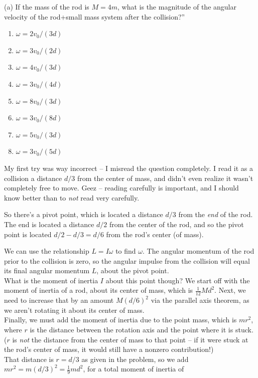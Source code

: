\documentclass[8.01x]{subfiles}
\begin{document}
(a) If the mass of the rod is $M=4m$, what is the magnitude of the angular velocity of the rod+small mass system after the collision?''

\begin{enumerate}
\item $\omega = 2 v_0/(3 d)$
\item $\omega = 3 v_0/(2 d)$
\item $\omega = 4 v_0/(3 d)$
\item $\omega = 3 v_0/(4 d)$
\item $\omega = 8 v_0/(3 d)$
\item $\omega = 3 v_0/(8 d)$
\item $\omega = 5 v_0/(3 d)$
\item $\omega = 3 v_0/(5 d)$
\end{enumerate}

My first try was way incorrect -- I misread the question completely. I read it as a collision a distance $d/3$ from the center of mass, and didn't even realize it wasn't completely free to move. Geez -- reading carefully is important, and I should know better than to \emph{not} read very carefully.

So there's a pivot point, which is located a distance $d/3$ from the \emph{end} of the rod. The end is located a distance $d/2$ from the center of the rod, and so the pivot point is located $d/2 - d/3 = d/6$ from the rod's center (of mass).

We can use the relationship $L = I \omega$ to find $\omega$. The angular momentum of the rod prior to the collision is zero, so the angular impulse from the collision will equal its final angular momentum $L$, about the pivot point.\\
What is the moment of inertia $I$ about this point though? We start off with the moment of inertia of a rod, about its center of mass, which is $\frac{1}{12} M d^2$. Next, we need to increase that by an amount $M (d/6)^2$ via the parallel axis theorem, as we aren't rotating it about its center of mass.\\
Finally, we must add the moment of inertia due to the point mass, which is $m r^2$, where $r$ is the distance between the rotation axis and the point where it is stuck. ($r$ is \emph{not} the distance from the center of mass to that point -- if it were stuck at the rod's center of mass, it would still have a nonzero contribution!)\\
That distance is $r = d/3$ as given in the problem, so we add $m r^2 = m (d/3)^2 = \frac{1}{9} m d^2$, for a total moment of inertia of
\end{document}
